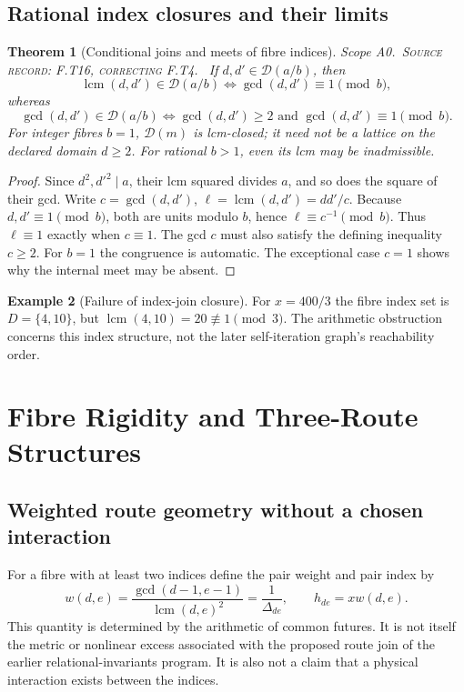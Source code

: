 \documentclass[11pt,oneside,openany]{book}
\newtheorem{theorem}{Theorem}[chapter]
\theoremstyle{definition}
\newtheorem{example}[theorem]{Example}
\theoremstyle{remark}
\newcommand{\Dx}{\mathcal{D}}
\newcommand{\lcmop}{\operatorname{lcm}}
\newcommand{\gcdop}{\operatorname{gcd}}
\newcommand{\scope}[1]{\textsf{\small Scope #1.}\ }
\newcommand{\record}[1]{\textup{\textsc{Source record: #1.}}\ }
\newcommand{\Del}{\Delta}
\begin{document}
\section{Rational index closures and their limits}
\begin{theorem}[Conditional joins and meets of fibre indices]\label{thm:join-fibre}
\scope{A0}\record{F.T16, correcting F.T4} If \(d,d'\in\Dx(a/b)\), then
\[
 \lcmop(d,d')\in\Dx(a/b)\iff\gcdop(d,d')\equiv1\pmod b,
\]
whereas
\[
 \gcdop(d,d')\in\Dx(a/b)\iff
 \gcdop(d,d')\ge2\text{ and }\gcdop(d,d')\equiv1\pmod b.
\]
For integer fibres \(b=1\), \(\Dx(m)\) is lcm-closed; it need not be a lattice on the declared domain \(d\ge2\). For rational \(b>1\), even its lcm may be inadmissible.
\end{theorem}
\begin{proof}
Since \(d^2,d'^2\mid a\), their lcm squared divides \(a\), and so does the square of their gcd. Write \(c=\gcdop(d,d')\), \(\ell=\lcmop(d,d')=dd'/c\). Because \(d,d'\equiv1\pmod b\), both are units modulo \(b\), hence \(\ell\equiv c^{-1}\pmod b\). Thus \(\ell\equiv1\) exactly when \(c\equiv1\). The gcd \(c\) must also satisfy the defining inequality \(c\ge2\). For \(b=1\) the congruence is automatic. The exceptional case \(c=1\) shows why the internal meet may be absent.
\end{proof}

\begin{example}[Failure of index-join closure]
For \(x=400/3\) the fibre index set is \(D=\{4,10\}\), but \(\lcmop(4,10)=20\not\equiv1\pmod3\). The arithmetic obstruction concerns this index structure, not the later self-iteration graph's reachability order.
\end{example}

\chapter{Fibre Rigidity and Three-Route Structures}\label{ch:rigidity}
\section{Weighted route geometry without a chosen interaction}
For a fibre with at least two indices define the pair weight and pair index by
\begin{equation}\label{eq:weight}
 w(d,e)=\frac{\gcdop(d-1,e-1)}{\lcmop(d,e)^2}
 =\frac1{\Del_{de}},\qquad
 h_{de}=xw(d,e).
\end{equation}
This quantity is determined by the arithmetic of common futures. It is not itself the metric or nonlinear excess associated with the proposed route join of the earlier relational-invariants program. It is also not a claim that a physical interaction exists between the indices.
\end{document}
